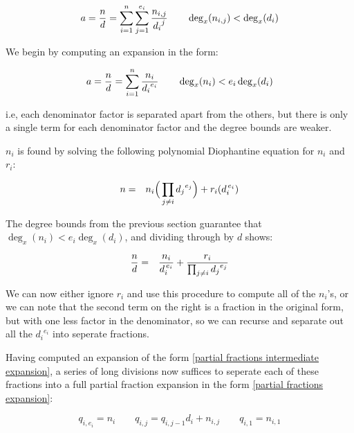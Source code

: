 \begin{equation}
\label{partial fractions expansion}
a={n\over d}=\sum_{i=1}^{n}\sum_{j=1}^{e_i} {n_{i,j}\over {d_i}^j}
\qquad \deg_x (n_{i,j}) < \deg_x (d_i)
\end{equation}

We begin by computing an expansion in the form:

\begin{equation}
\label{partial fractions intermediate expansion}
a={n\over d}=\sum_{i=1}^{n} {n_i\over {d_i}^{e_i}}
\qquad \deg_x (n_i) < e_i\deg_x (d_i)
\end{equation}

i.e, each denominator factor is separated apart from the
others, but there is only a single term for each
denominator factor and the degree bounds are weaker.

$n_i$ is found by solving the following polynomial Diophantine
equation for $n_i$ and $r_i$:

\begin{eqnarray*}
n &=& n_i \Big( \prod_{j\ne i} {d_j}^{e_j} \Big) + r_i (d_i^{\,e_i}) \cr
\end{eqnarray*}

The degree bounds from the previous section guarantee that
$\deg_x (n_i) < e_i \deg_x (d_i)$, and dividing through by $d$ shows:

\begin{eqnarray*}
{n\over d} &=& {{n_i}\over{d_i^{\,e_i}}} + {r_i\over{\prod_{j\ne i} {d_j}^{e_j}}} \cr
\end{eqnarray*}

We can now either ignore $r_i$ and use this procedure to compute
all of the $n_i$'s, or we can note that
the second term on the right is a fraction in the original form,
but with one less factor in the denominator, so we can recurse
and separate out all the ${d_i}^{e_i}$ into seperate fractions.

Having computed an expansion of the form \eqref{partial fractions
intermediate expansion}, a series of long divisions now suffices to
seperate each of these fractions into a full partial fraction expansion in the
form \eqref{partial fractions expansion}:


\begin{equation*}
q_{i,e_i} = n_i \qquad
q_{i,j} = q_{i,j-1} d_i + n_{i,j} \qquad
q_{i,1} = n_{i,1}
\end{equation*}

